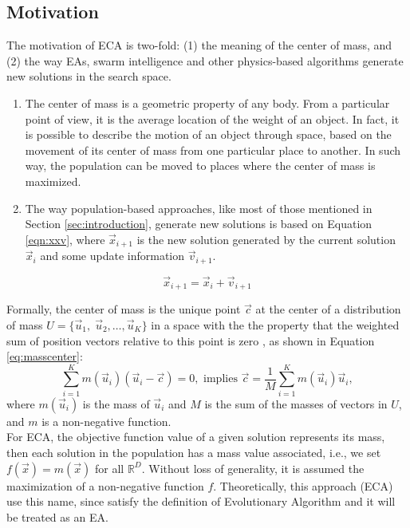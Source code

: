 \documentclass[12pt,letterpape]{article}
\begin{document}
\subsection{Motivation} %
The motivation of ECA is two-fold: (1) the meaning of the center of mass, and (2) 
the way EAs, swarm intelligence and other physics-based algorithms generate new 
solutions in the search space. 
% 
\begin{enumerate}
	\item The center of mass is a geometric property of any body. From a particular 
		  point of view, it is the average location of the weight of an object. 
		  In fact, it is possible to describe the motion of an object through 
		  space, based on the movement of its center of mass from one particular 
		  place to another. In such way, the population can be moved to places 
		  where the center of mass is maximized. 
	\item The way population-based approaches, like most of those mentioned in 
		  Section \ref{sec:introduction}, generate new solutions is based on 
		  Equation \ref{eqn:xxv}, where $\vec{x}_{i + 1}$ is the new solution 
		  generated by the current solution $\vec{x}_{i}$ and some update 
		  information $\vec{v}_{i + 1}$. 
\end{enumerate}
\begin{equation}
	\vec{x}_{i + 1} = \vec{x}_{i} + \vec{v}_{i + 1}
	\label{eqn:xxv}
\end{equation}
% 

Formally, the center of mass is the unique point $\vec{c}$ at the center of a 
distribution of mass $U = \{\vec{u}_1,\; \vec{u}_2 , \ldots , \vec{u}_K \}$ in a 
space with the the property that the weighted sum of position vectors relative 
to this point is zero \cite{kleppner73,serway}, as shown in Equation \ref{eq:masscenter}:
%
%
\begin{equation}
	\sum_{i = 1}^K m(\vec{u}_i) (\vec{u}_i - \vec{c}) = 0, \text{ implies } 
	\vec{c} = \dfrac{1}{M} \sum_{i = 1}^K  m(\vec{u}_i)  \vec{u}_i,
	\label{eq:masscenter}
\end{equation}
%
%
where $m(\vec{u}_i)$ is the mass of $\vec{u}_i$ and  $M$ is the sum of the 
masses of vectors in $U$, and $m$ is a non-negative function.\\


For ECA, the objective function value of a given solution represents
its mass, then each solution in the population has a mass value associated,  i.e., 
we set $f(\vec{x}) = m(\vec{x})$ for all $\mathbb{R}^D$. Without loss of generality, 
it is assumed the maximization of a non-negative function $f$. 
Theoretically, this approach (ECA) use this name, since satisfy the definition of
Evolutionary Algorithm \cite{back} and it will be treated as an EA.
\end{document}
